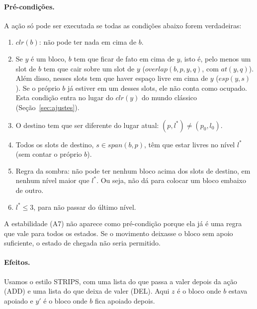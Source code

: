 \documentclass[11pt,a4paper]{article}
\newcommand{\clr}{\mathit{clr}}
\newcommand{\at}{\mathit{at}}
\newcommand{\esp}{\mathit{esp}}
\newcommand{\spn}{\mathit{span}}
\newcommand{\ov}{\mathit{overlap}}
\begin{document}
\paragraph{Pré-condições.} A ação só pode ser executada se todas as condições abaixo
forem verdadeiras:
\begin{enumerate}
  \item[P1] $\clr(b)$: não pode ter nada em cima de $b$.
  \item[P2] Se $y$ é um bloco, $b$ tem que ficar de fato em cima de $y$, isto é,
            pelo menos um slot de $b$ tem que cair sobre um slot de $y$
            ($\ov(b,p,y,q)$, com $\at(y,q)$). Além disso, nesses slots tem que
            haver espaço livre em cima de $y$ ($\esp(y,s)$). Se o próprio $b$ já
            estiver em um desses slots, ele não conta como ocupado. Esta condição
            entra no lugar do $\clr(y)$ do mundo clássico (Seção~\ref{sec:ajustes}).
  \item[P3] O destino tem que ser diferente do lugar atual:
            $(p,l^\ast)\neq(p_0,l_0)$.
  \item[P4] Todos os slots de destino, $s\in\spn(b,p)$, têm que estar livres no
            nível $l^\ast$ (sem contar o próprio $b$).
  \item[P5] Regra da sombra: não pode ter nenhum bloco acima dos slots de destino,
            em nenhum nível maior que $l^\ast$. Ou seja, não dá para colocar um
            bloco embaixo de outro.
  \item[P6] $l^\ast\le 3$, para não passar do último nível.
\end{enumerate}
A estabilidade (A7) não aparece como pré-condição porque ela já é uma regra que vale
para todos os estados. Se o movimento deixasse o bloco sem apoio suficiente, o estado
de chegada não seria permitido.

\paragraph{Efeitos.} Usamos o estilo STRIPS, com uma lista do que passa a valer depois
da ação (ADD) e uma lista do que deixa de valer (DEL). Aqui $z$ é o bloco onde $b$
estava apoiado e $y'$ é o bloco onde $b$ fica apoiado depois.
\end{document}
